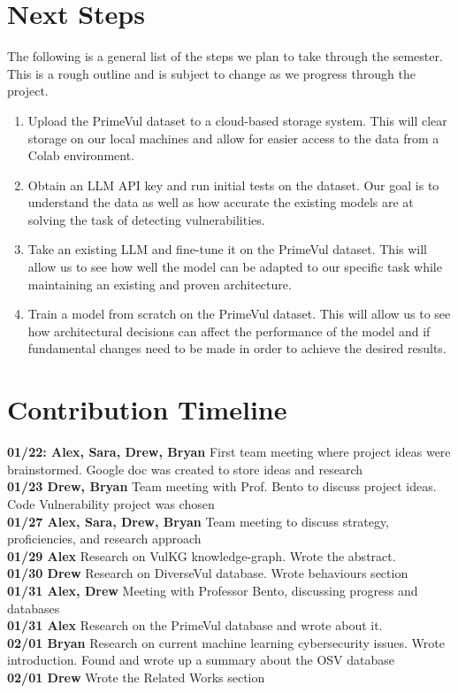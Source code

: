 \documentclass{article}
\begin{document}
\section{Next Steps}
The following is a general list of the steps we plan to take through the semester.
This is a rough outline and is subject to change as we progress through the project.

\begin{enumerate}
  \item Upload the PrimeVul dataset to a cloud-based storage system. This will clear 
    storage on our local machines and allow for 
    easier access to the data from a Colab environment.
  \item Obtain an LLM API key and run initial tests on the dataset. Our goal is to 
    understand the data as well as how accurate the existing models are at solving
    the task of detecting vulnerabilities.
  \item Take an existing LLM and fine-tune it on the PrimeVul dataset. This will allow
    us to see how well the model can be adapted to our specific task while maintaining
    an existing and proven architecture.
  \item Train a model from scratch on the PrimeVul dataset. This will allow us to see
    how architectural decisions can affect the performance of the model and if fundamental
    changes need to be made in order to achieve the desired results.
\end{enumerate}

\section{Contribution Timeline}
\textbf{01/22: Alex, Sara, Drew, Bryan} First team meeting where project ideas were
brainstormed. Google doc was created to store ideas and research \\
\textbf{01/23 Drew, Bryan} Team meeting with Prof. Bento to discuss project ideas.
Code Vulnerability project was chosen \\
\textbf{01/27 Alex, Sara, Drew, Bryan} Team meeting to discuss strategy, proficiencies, 
and research approach \\
\textbf{01/29 Alex} Research on VulKG knowledge-graph. Wrote the abstract. \\
\textbf{01/30 Drew} Research on DiverseVul database. Wrote behaviours section \\
\textbf{01/31 Alex, Drew} Meeting with Professor Bento, discussing progress and databases \\
\textbf{01/31 Alex} Research on the PrimeVul database and wrote about it. \\
\textbf{02/01 Bryan} Research on current machine learning cybersecurity issues. Wrote
introduction. Found and wrote up a summary about the OSV database \\
\textbf{02/01 Drew} Wrote the Related Works section \\

      

\end{document}
